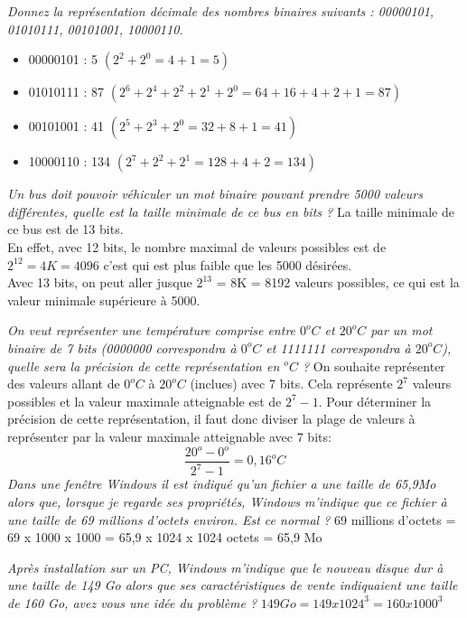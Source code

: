 {
\textit{Donnez la représentation décimale des nombres binaires suivants : 00000101, 01010111, 00101001, 10000110.}
}
{%
\begin{itemize}
\item 00000101 : 5 $(2^2+2^0=4+1=5)$
\item 01010111 : 87 $(2^6+2^4+2^2+2^1+2^0=64+16+4+2+1=87)$
\item 00101001 : 41 $(2^5+2^3+2^0=32+8+1=41)$
\item 10000110 : 134 $(2^7+2^2+2^1=128+4+2=134)$
\end{itemize}
}


{
\textit{Un bus doit pouvoir véhiculer un mot binaire pouvant prendre 5000 valeurs différentes, quelle est la taille minimale de ce bus en bits ?}
}
{%
La taille minimale de ce bus est de 13 bits.\\
En effet, avec 12 bits, le nombre maximal de valeurs possibles est de $2^{12}=4K=4096$ c'est qui est plus faible que les 5000 désirées.\\
Avec 13 bits, on peut aller jusque $2^{13}$ = 8K = 8192 valeurs possibles, ce qui est la valeur minimale supérieure à 5000.
}

{
\textit{On veut représenter une température comprise entre $0^oC$ et $20^oC$ par un mot binaire de 7 bits (0000000 correspondra à $0^oC$ et 1111111 correspondra à $20^oC$), quelle sera la précision de cette représentation en $^oC$ ?}
}
{%
On souhaite représenter des valeurs allant de $0^oC$ à $20^oC$ (inclues) avec 7 bits. Cela représente $2^7$ valeurs possibles et la valeur maximale atteignable est de $2^7-1$. Pour déterminer la précision de cette représentation, il faut donc diviser la plage de valeurs à représenter par la valeur maximale atteignable avec 7 bits:
$$\frac{20^o-0^o}{2^7 - 1}=0,16^oC$$
}
{
\textit{Dans une fenêtre Windows il est indiqué qu’un fichier a une taille de 65,9Mo alors que, lorsque je regarde ses propriétés, Windows m’indique que ce fichier à une taille de 69 millions d'octets environ. Est ce normal ?}
}
{%
69 millions d’octets = 69 x 1000 x 1000 = 65,9 x 1024 x 1024 octets = 65,9 Mo
}

{
\textit{Après installation sur un PC, Windows m’indique que le nouveau disque dur à une taille de 149 Go alors que ses caractéristiques de vente indiquaient une taille de 160 Go, avez vous une idée du problème ?}
}
{%
$149 Go = 149 x 1024^3 = 160 x 1000^3$
}

